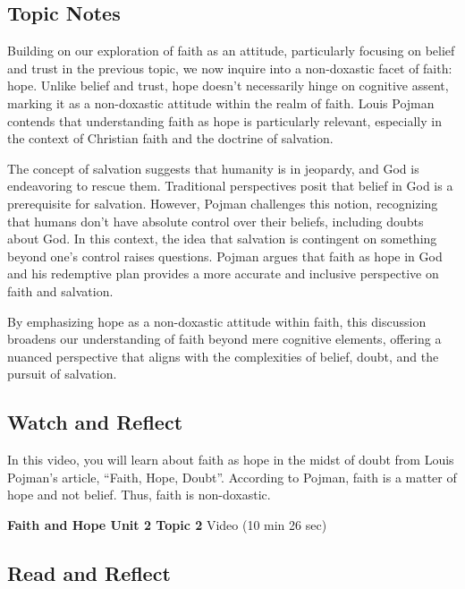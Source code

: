 \documentclass[
]{book}
\begin{document}
\hypertarget{topic-notes-5}{%
\subsection*{Topic Notes}\label{topic-notes-5}}

Building on our exploration of faith as an attitude, particularly focusing on belief and trust in the previous topic, we now inquire into a non-doxastic facet of faith: hope. Unlike belief and trust, hope doesn't necessarily hinge on cognitive assent, marking it as a non-doxastic attitude within the realm of faith. Louis Pojman contends that understanding faith as hope is particularly relevant, especially in the context of Christian faith and the doctrine of salvation.

The concept of salvation suggests that humanity is in jeopardy, and God is endeavoring to rescue them. Traditional perspectives posit that belief in God is a prerequisite for salvation. However, Pojman challenges this notion, recognizing that humans don't have absolute control over their beliefs, including doubts about God. In this context, the idea that salvation is contingent on something beyond one's control raises questions. Pojman argues that faith as hope in God and his redemptive plan provides a more accurate and inclusive perspective on faith and salvation.

By emphasizing hope as a non-doxastic attitude within faith, this discussion broadens our understanding of faith beyond mere cognitive elements, offering a nuanced perspective that aligns with the complexities of belief, doubt, and the pursuit of salvation.

\hypertarget{watch-and-reflect-8}{%
\subsection*{Watch and Reflect}\label{watch-and-reflect-8}}

In this video, you will learn about faith as hope in the midst of doubt from Louis Pojman's article, ``Faith, Hope, Doubt''. According to Pojman, faith is a matter of hope and not belief. Thus, faith is non-doxastic.

\textbf{Faith and Hope Unit 2 Topic 2} Video (10 min 26 sec)

\hypertarget{read-and-reflect-4}{%
\subsection*{Read and Reflect}\label{read-and-reflect-4}}
\end{document}
